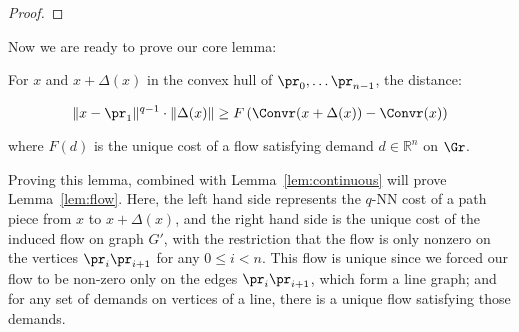 \begin{proof}
\end{proof}

Now we are ready to prove our core lemma:
\begin{lemma} For $x$ and $x+\Delta(x)$ in the convex hull of $\pr_0,
\ldots \pr_{n-1}$, the distance:

\[ \|x-\pr_1\|^{q-1} \cdot \|\Delta(x)\| \geq
F\left(\Convr(x+\Delta(x))-\Convr(x)\right)\]

where $F(d)$ is the unique cost of a flow satisfying demand $d \in
\mathbb{R}^n$ on $\Gr$.

\end{lemma}
Proving this lemma, combined with Lemma~\ref{lem:continuous} will prove
Lemma~\ref{lem:flow}.
Here, the left hand side represents the $q$-NN cost of a path piece from
$x$ to $x+\Delta(x)$, and the right hand side is the unique cost of the
induced flow on graph $G'$, with the restriction that the flow is only
nonzero on the vertices $\pr_i\pr_{i+1}$ for any $0 \leq i < n$. This flow
is unique since we forced our flow to be non-zero only on the edges
$\pr_i\pr_{i+1}$, which form a line graph; and for any set of demands on
vertices of a line, there is a unique flow satisfying those demands.

